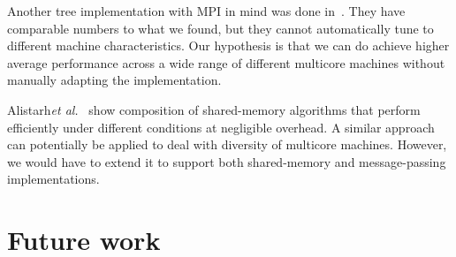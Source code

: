 \documentclass{article}
\newcommand{\etal}{{\it et al.}\xspace}
\begin{document}
Another tree implementation with MPI in mind was done
in~\cite{Graham2008}. They have comparable numbers to what we found,
but they cannot automatically tune to different machine
characteristics. Our hypothesis is that we can do achieve higher
average performance across a wide range of different multicore
machines without manually adapting the implementation.

Alistarh\etal~\cite{Alistarh2012} show composition of shared-memory
algorithms that perform efficiently under different conditions at
negligible overhead. A similar approach can potentially be applied to
deal with diversity of multicore machines. However, we would have
to extend it to support both shared-memory and message-passing
implementations. 

\section{Future work}

\newcommand{\nary}{$n$-ary\xspace}
\end{document}
